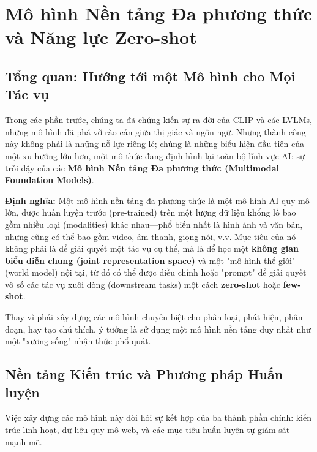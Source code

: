 \section{Mô hình Nền tảng Đa phương thức và Năng lực Zero-shot}
\label{sec:multimodal_foundation_models}

\subsection{Tổng quan: Hướng tới một Mô hình cho Mọi Tác vụ}
\label{subsec:mfm_overview}
Trong các phần trước, chúng ta đã chứng kiến sự ra đời của CLIP và các LVLMs, những mô hình đã phá vỡ rào cản giữa thị giác và ngôn ngữ. Những thành công này không phải là những nỗ lực riêng lẻ; chúng là những biểu hiện đầu tiên của một xu hướng lớn hơn, một mô thức đang định hình lại toàn bộ lĩnh vực AI: sự trỗi dậy của các \textbf{Mô hình Nền tảng Đa phương thức (Multimodal Foundation Models)}.

\textbf{Định nghĩa:} Một mô hình nền tảng đa phương thức là một mô hình AI quy mô lớn, được huấn luyện trước (pre-trained) trên một lượng dữ liệu khổng lồ bao gồm nhiều loại (modalities) khác nhau—phổ biến nhất là hình ảnh và văn bản, nhưng cũng có thể bao gồm video, âm thanh, giọng nói, v.v. Mục tiêu của nó không phải là để giải quyết một tác vụ cụ thể, mà là để học một \textbf{không gian biểu diễn chung (joint representation space)} và một "mô hình thế giới" (world model) nội tại, từ đó có thể được điều chỉnh hoặc "prompt" để giải quyết vô số các tác vụ xuôi dòng (downstream tasks) một cách \textbf{zero-shot} hoặc \textbf{few-shot}.

Thay vì phải xây dựng các mô hình chuyên biệt cho phân loại, phát hiện, phân đoạn, hay tạo chú thích, ý tưởng là sử dụng một mô hình nền tảng duy nhất như một "xương sống" nhận thức phổ quát.

\subsection{Nền tảng Kiến trúc và Phương pháp Huấn luyện}
\label{subsec:mfm_architecture_training}
Việc xây dựng các mô hình này đòi hỏi sự kết hợp của ba thành phần chính: kiến trúc linh hoạt, dữ liệu quy mô web, và các mục tiêu huấn luyện tự giám sát mạnh mẽ.

